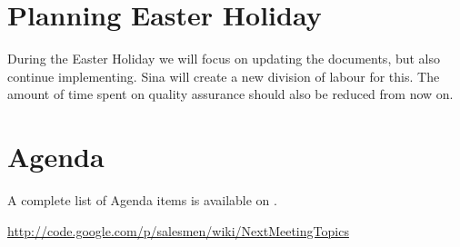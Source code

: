 \documentclass[a4paper, 12pt]{article}
\begin{document}
	\section{Planning Easter Holiday}
		During the Easter Holiday we will focus on updating the documents, but also continue implementing. Sina will create a new division of labour for this. The amount of time spent on quality assurance should also be reduced from now on.
	
	
	\section{Agenda}
A complete list of Agenda items is available on \cite{agendaitems}.\\
	
	\begin{thebibliography}{99}
		
		\href{http://code.google.com/p/salesmen/wiki/NextMeetingTopics}{http://code.google.com/p/salesmen/wiki/NextMeetingTopics}
		
	\end{thebibliography}	
		
\end{document}
